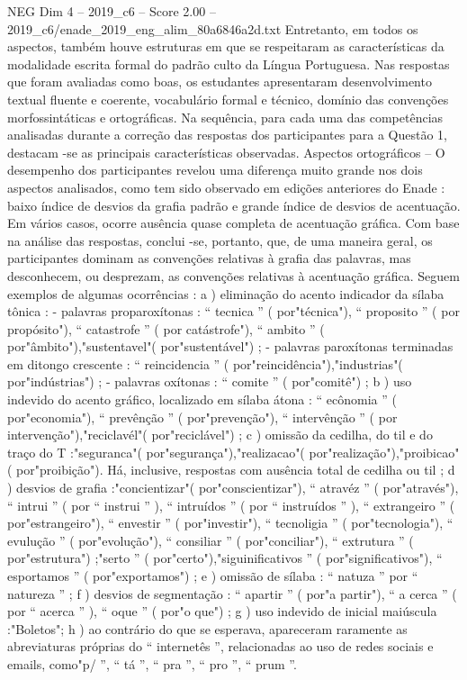 \begin{textsample}{NEG Dim 4 – 2019\_c6 – Score 2.00 – 2019\_c6/enade\_2019\_eng\_alim\_80a6846a2d.txt}
Entretanto, em todos os aspectos, também houve estruturas em que se respeitaram as características da modalidade escrita formal do padrão culto da Língua Portuguesa.
Nas respostas que foram avaliadas como boas, os estudantes apresentaram desenvolvimento textual fluente e coerente, vocabulário formal e técnico, domínio das convenções morfossintáticas e ortográficas.
Na sequência, para cada uma das competências analisadas durante a correção das respostas dos participantes para a Questão 1, destacam -se as principais características observadas.
Aspectos ortográficos – O desempenho dos participantes revelou uma diferença muito grande nos dois aspectos analisados, como tem sido observado em edições anteriores do Enade : baixo índice de desvios da grafia padrão e grande índice de desvios de acentuação.
Em vários casos, ocorre ausência quase completa de acentuação gráfica.
Com base na análise das respostas, conclui -se, portanto, que, de uma maneira geral, os participantes dominam as convenções relativas à grafia das palavras, mas desconhecem, ou desprezam, as convenções relativas à acentuação gráfica.
Seguem exemplos de algumas ocorrências : a ) eliminação do acento indicador da sílaba tônica : - palavras proparoxítonas : “ tecnica ” ( por"técnica"), “ proposito ” ( por propósito"), “ catastrofe ” ( por catástrofe"), “ ambito ” ( por"âmbito"),"sustentavel"( por"sustentável") ; - palavras paroxítonas terminadas em ditongo crescente : “ reincidencia ” ( por"reincidência"),"industrias"( por"indústrias") ; - palavras oxítonas : “ comite ” ( por"comitê") ; b ) uso indevido do acento gráfico, localizado em sílaba átona : “ ecônomia ” ( por"economia"), “ prevênção ” ( por"prevenção"), “ intervênção ” ( por intervenção"),"reciclavél"( por"reciclável") ; c ) omissão da cedilha, do til e do traço do T :"seguranca"( por"segurança"),"realizacao"( por"realização"),"proibicao"( por"proibição").
Há, inclusive, respostas com ausência total de cedilha ou til ; d ) desvios de grafia :"concientizar"( por"conscientizar"), “ atravéz ” ( por"através"), “ intrui ” ( por “ instrui ” ), “ intruídos ” ( por “ instruídos ” ), “ extrangeiro ” ( por"estrangeiro"), “ envestir ” ( por"investir"), “ tecnoligia ” ( por"tecnologia"), “ evulução ” ( por"evolução"), “ consiliar ” ( por"conciliar"), “ extrutura ” ( por"estrutura") ;"serto ” ( por"certo"),"siguinificativos ” ( por"significativos"), “ esportamos ” ( por"exportamos") ; e ) omissão de sílaba : “ natuza ” por “ natureza ” ; f ) desvios de segmentação : “ apartir ” ( por"a partir"), “ a cerca ” ( por “ acerca ” ), “ oque ” ( por"o que") ; g ) uso indevido de inicial maiúscula :"Boletos"; h ) ao contrário do que se esperava, apareceram raramente as abreviaturas próprias do “ internetês ”, relacionadas ao uso de redes sociais e emails, como"p/ ”, “ tá ”, “ pra ”, “ pro ”, “ prum ”.

\end{textsample}
